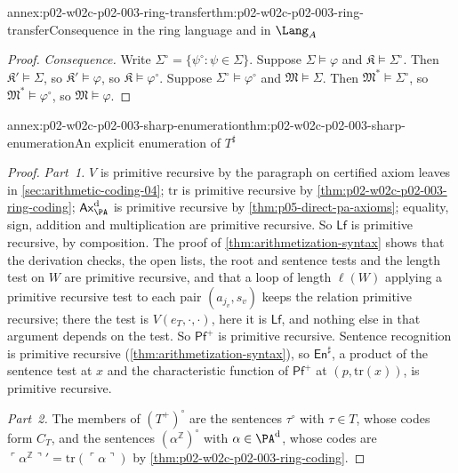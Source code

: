\begin{annexitem}{annex:p02-w02c-p02-003-ring-transfer}{thm:p02-w02c-p02-003-ring-transfer}{Consequence in the ring language and in \(\Lang_A\)}
\begin{proof}
\emph{Consequence.}  Write \(\Sigma^{\circ}=\{\psi^{\circ}:\psi\in\Sigma\}\).
Suppose \(\Sigma\models\varphi\) and \(\mathfrak K\models\Sigma^{\circ}\).
Then \(\mathfrak K'\models\Sigma\), so \(\mathfrak K'\models\varphi\), so
\(\mathfrak K\models\varphi^{\circ}\).  Suppose
\(\Sigma^{\circ}\models\varphi^{\circ}\) and \(\mathfrak M\models\Sigma\).
Then \(\mathfrak M^{*}\models\Sigma^{\circ}\), so
\(\mathfrak M^{*}\models\varphi^{\circ}\), so \(\mathfrak M\models\varphi\).
\end{proof}
\end{annexitem}

\begin{annexitem}{annex:p02-w02c-p02-003-sharp-enumeration}{thm:p02-w02c-p02-003-sharp-enumeration}{An explicit enumeration of \(T^{\sharp}\)}
\begin{proof}
\emph{Part~1.}  \(V\) is primitive recursive by the paragraph on certified
axiom leaves in \cref{sec:arithmetic-coding-04}; \(\mathrm{tr}\) is
primitive recursive by \cref{thm:p02-w02c-p02-003-ring-coding};
\(\mathsf{Ax}^{\rm d}_{\PA}\) is primitive recursive by
\cref{thm:p05-direct-pa-axioms}; equality, sign, addition and
multiplication are primitive recursive.  So \(\mathsf{Lf}\) is primitive
recursive, by composition.  The proof of \cref{thm:arithmetization-syntax}
shows that the derivation checks, the open lists, the root and sentence
tests and the length test on \(W\) are primitive recursive, and that a loop
of length \(\ell(W)\) applying a primitive recursive test to each pair
\((a_{j_v},s_v)\) keeps the relation primitive recursive; there the test is
\(V(e_T,\cdot,\cdot)\), here it is \(\mathsf{Lf}\), and nothing else in that
argument depends on the test.  So \(\mathsf{Pf}^{+}\) is primitive
recursive.  Sentence recognition is primitive recursive
(\cref{thm:arithmetization-syntax}), so \(\mathsf{En}^{\sharp}\), a product
of the sentence test at \(x\) and the characteristic function of
\(\mathsf{Pf}^{+}\) at \((p,\mathrm{tr}(x))\), is primitive recursive.

\emph{Part~2.}  The members of \((T^{+})^{\circ}\) are the sentences
\(\tau^{\circ}\) with \(\tau\in T\), whose codes form \(C_T\), and the
sentences \((\alpha^{\mathbb Z})^{\circ}\) with \(\alpha\in\PA^{\rm d}\),
whose codes are \(\ulcorner\alpha^{\mathbb Z}\urcorner'=
\mathrm{tr}(\ulcorner\alpha\urcorner)\) by
\cref{thm:p02-w02c-p02-003-ring-coding}.


\end{proof}
\end{annexitem}
